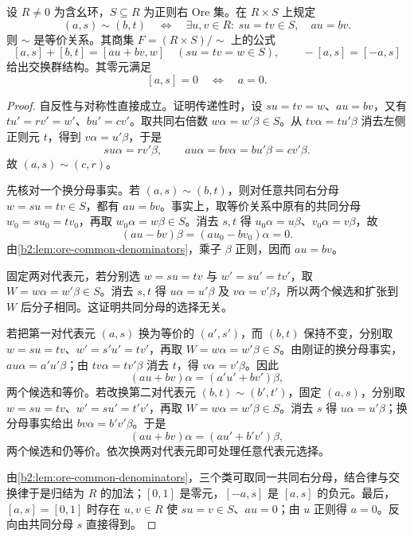 \begin{lemma}[右分式类的加法]\label{b2:lem:ore-additive-classes}
	设 \(R\ne0\) 为含幺环，\(S\subseteq R\) 为正则右 Ore 集。在 \(R\times S\) 上规定
	\begin{equation}\label{b2:eq:ore-equivalence}
		(a,s)\sim(b,t) \quad\Longleftrightarrow\quad \exists u,v\in R:\ su=tv\in S,\quad au=bv.
	\end{equation}
	则 \(\sim\) 是等价关系。其商集 \(F=(R\times S)/{\sim}\) 上的公式
	\[
		[a,s]+[b,t]=[au+bv,w]\quad(su=tv=w\in S), \qquad -[a,s]=[-a,s]
	\]
	给出交换群结构。其零元满足
	\begin{equation}\label{b2:eq:ore-zero-numerator}
		[a,s]=0\quad\Longleftrightarrow\quad a=0.
	\end{equation}
\end{lemma}
\begin{proof}
	自反性与对称性直接成立。证明传递性时，设 \(su=tv=w\)、\(au=bv\)，又有 \(tu'=rv'=w'\)、\(bu'=cv'\)。取共同右倍数 \(w\alpha=w'\beta\in S\)。从 \(tv\alpha=tu'\beta\) 消去左侧正则元 \(t\)，得到 \(v\alpha=u'\beta\)，于是
	\[
		s u\alpha=r v'\beta,\qquad a u\alpha=bv\alpha=bu'\beta=cv'\beta.
	\]
	故 \((a,s)\sim(c,r)\)。

	先核对一个换分母事实。若 \((a,s)\sim(b,t)\)，则对任意共同右分母 \(w=su=tv\in S\)，都有 \(au=bv\)。事实上，取等价关系中原有的共同分母 \(w_0=su_0=tv_0\)，再取 \(w_0\alpha=w\beta\in S\)。消去 \(s,t\) 得 \(u_0\alpha=u\beta\)、\(v_0\alpha=v\beta\)，故
	\[
		(au-bv)\beta=(au_0-bv_0)\alpha=0.
	\]
	由\cref{b2:lem:ore-common-denominators}，乘子 \(\beta\) 正则，因而 \(au=bv\)。

	固定两对代表元，若分别选 \(w=su=tv\) 与 \(w'=su'=tv'\)，取 \(W=w\alpha=w'\beta\in S\)。消去 \(s,t\) 得 \(u\alpha=u'\beta\) 及 \(v\alpha=v'\beta\)，所以两个候选和扩张到 \(W\) 后分子相同。这证明共同分母的选择无关。

	若把第一对代表元 \((a,s)\) 换为等价的 \((a',s')\)，而 \((b,t)\) 保持不变，分别取 \(w=su=tv\)、\(w'=s'u'=tv'\)，再取 \(W=w\alpha=w'\beta\in S\)。由刚证的换分母事实，\(a u\alpha=a'u'\beta\)；由 \(tv\alpha=tv'\beta\) 消去 \(t\)，得 \(v\alpha=v'\beta\)。因此
	\[
		(au+bv)\alpha=(a'u'+bv')\beta,
	\]
	两个候选和等价。若改换第二对代表元 \((b,t)\sim(b',t')\)，固定 \((a,s)\)，分别取 \(w=su=tv\)、\(w'=su'=t'v'\)，再取 \(W=w\alpha=w'\beta\in S\)。消去 \(s\) 得 \(u\alpha=u'\beta\)；换分母事实给出 \(bv\alpha=b'v'\beta\)。于是
	\[
		(au+bv)\alpha=(au'+b'v')\beta,
	\]
	两个候选和仍等价。依次换两对代表元即可处理任意代表元选择。

	由\cref{b2:lem:ore-common-denominators}，三个类可取同一共同右分母，结合律与交换律于是归结为 \(R\) 的加法；\([0,1]\) 是零元，\([-a,s]\) 是 \([a,s]\) 的负元。最后，\([a,s]=[0,1]\) 时存在 \(u,v\in R\) 使 \(su=v\in S\)、\(au=0\)；由 \(u\) 正则得 \(a=0\)。反向由共同分母 \(s\) 直接得到。
\end{proof}

